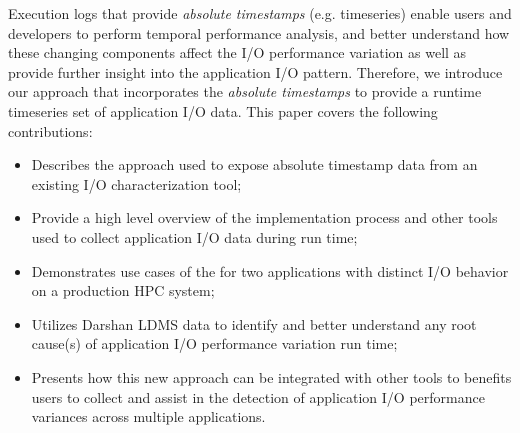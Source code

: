 
Execution logs that provide \emph{absolute timestamps}
(e.g. timeseries) enable users and developers to perform temporal
performance analysis, and better understand how these changing
components affect the I/O performance variation as well as provide
further insight into the application I/O pattern. Therefore, we
introduce our \Darshan{} approach that incorporates the \emph{absolute
  timestamps} to provide a runtime timeseries set of application I/O data. 
  This paper covers the following contributions:

\begin{itemize}
	\item Describes the approach used to expose absolute timestamp
          data from an existing I/O characterization tool;
       	\item Provide a high level overview of the implementation
          process and other tools used to collect application I/O data
          during run time;
  	\item Demonstrates use cases of the \connector{} for two
          applications with distinct I/O behavior on a production HPC
          system;
        \item Utilizes Darshan LDMS data to identify and better
          understand any root cause(s) of application I/O performance
          variation run time;
	\item Presents how this new approach can be integrated with
          other tools to benefits users to collect and assist in the
          detection of application I/O performance variances across
          multiple applications.
\end{itemize}

         
